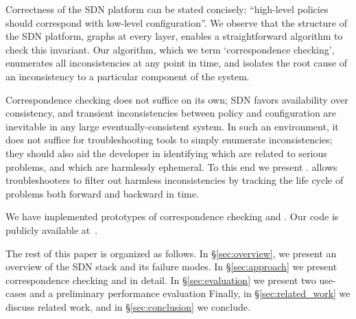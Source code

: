 Correctness of the SDN platform can be stated concisely: ``high-level policies
should correspond with low-level configuration''. We observe that the structure
of the SDN platform, graphs at every layer, enables a straightforward
algorithm to check this invariant. Our algorithm, which we term
`correspondence checking',
enumerates all inconsistencies at any point in time, and isolates the
root cause of an inconsistency to a particular component of the system.

Correspondence checking does not suffice on its own; SDN
favors availability over consistency, and transient inconsistencies
between policy and configuration
are inevitable in any large eventually-consistent system.
In such an environment, it does not suffice for troubleshooting tools to
simply enumerate inconsistencies; they should also aid the developer
in identifying which are related to serious problems, and which are
harmlessly ephemeral. To this end we present \simulator.
\Simulator{} allows troubleshooters 
to filter out harmless inconsistencies by tracking the life cycle of problems 
both forward and backward in time.

We have implemented prototypes
of correspondence checking and \simulator{}. Our code is publicly available
at~\cite{github}.

The rest of this paper is organized as follows. In \S\ref{sec:overview},
we present an overview of the SDN stack and its failure modes.
In \S\ref{sec:approach} we present correspondence checking and
\simulator{} in detail. In \S\ref{sec:evaluation} we present
two use-cases and a preliminary performance evaluation
Finally, in \S\ref{sec:related_work} we discuss related work,
and in \S\ref{sec:conclusion} we conclude.
